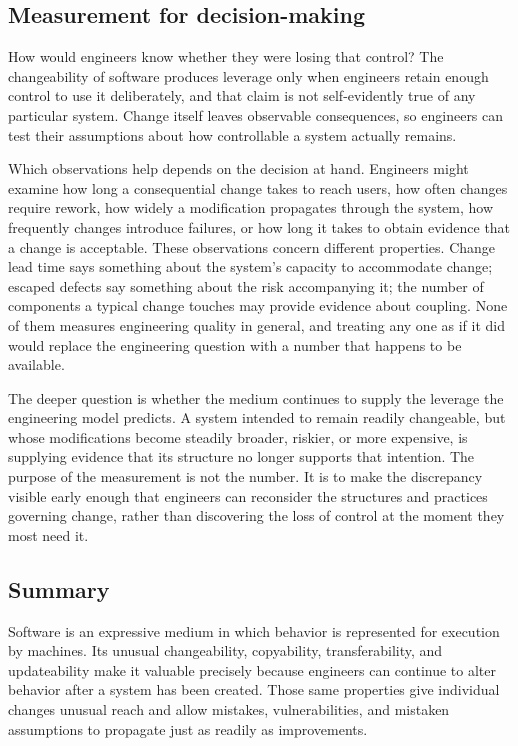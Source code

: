 \subsection{Measurement for decision-making}\label{sec-measurement-software-engineering}

How would engineers know whether they were losing that control? The changeability of software
produces leverage only when engineers retain enough control to use it deliberately, and that claim is
not self-evidently true of any particular system. Change itself leaves observable consequences, so
engineers can test their assumptions about how controllable a system actually remains.

Which observations help depends on the decision at hand. Engineers might examine how long a
consequential change takes to reach users, how often changes require rework, how widely a
modification propagates through the system, how frequently changes introduce failures, or how long it
takes to obtain evidence that a change is acceptable. These observations concern different
properties. Change lead time says something about the system's capacity to accommodate change;
escaped defects say something about the risk accompanying it; the number of components a typical
change touches may provide evidence about coupling. None of them measures engineering quality in
general, and treating any one as if it did would replace the engineering question with a number that
happens to be available.

The deeper question is whether the medium continues to supply the leverage the engineering model
predicts. A system intended to remain readily changeable, but whose modifications become steadily
broader, riskier, or more expensive, is supplying evidence that its structure no longer supports that
intention. The purpose of the measurement is not the number. It is to make the discrepancy visible
early enough that engineers can reconsider the structures and practices governing change, rather than
discovering the loss of control at the moment they most need it.

\subsection{Summary}\label{summary}

Software is an expressive medium in which behavior is represented for execution by machines. Its unusual
changeability, copyability, transferability, and updateability make it valuable precisely because
engineers can continue to alter behavior after a system has been created. Those same properties give
individual changes unusual reach and allow mistakes, vulnerabilities, and mistaken assumptions to
propagate just as readily as improvements.

